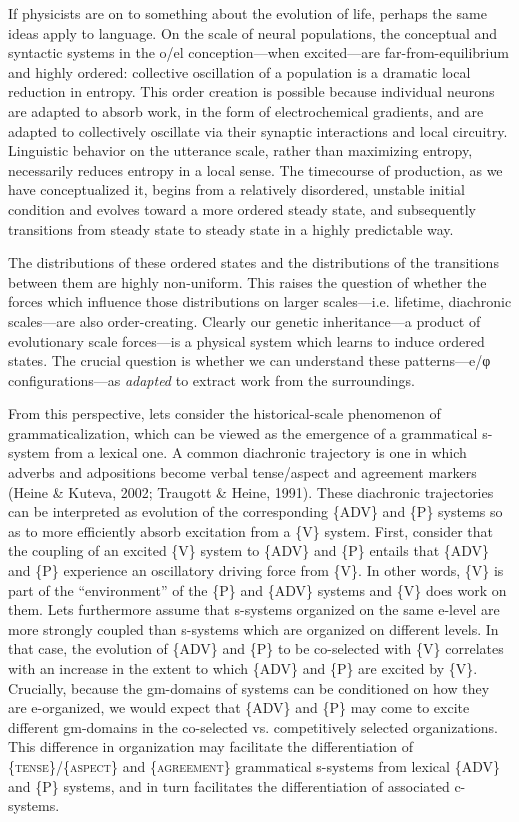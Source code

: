   If physicists are on to something about the evolution of life, perhaps the same ideas apply to language. On the scale of neural populations, the conceptual and syntactic systems in the o/el conception—when excited—are far-from-equilibrium and highly ordered: collective oscillation of a population is a dramatic local reduction in entropy. This order creation is possible because individual neurons are adapted to absorb work, in the form of electrochemical gradients, and are adapted to collectively oscillate via their synaptic interactions and local circuitry. Linguistic behavior on the utterance scale, rather than maximizing entropy, necessarily reduces entropy in a local sense. The timecourse of production, as we have conceptualized it, begins from a relatively disordered, unstable initial condition and evolves toward a more ordered steady state, and subsequently transitions from steady state to steady state in a highly predictable way. 

  The distributions of these ordered states and the distributions of the transitions between them are highly non-uniform. This raises the question of whether the forces which influence those distributions on larger scales—i.e. lifetime, diachronic scales—are also order-creating. Clearly our genetic inheritance—a product of evolutionary scale forces—is a physical system which learns to induce ordered states. The crucial question is whether we can understand these patterns—e/φ configurations—as \textit{adapted} to extract work from the surroundings.

  From this perspective, lets consider the historical-scale phenomenon of grammaticalization, which can be viewed as the emergence of a grammatical s-system from a lexical one. A common diachronic trajectory is one in which adverbs and adpositions become verbal tense/aspect and agreement markers (Heine \& Kuteva, 2002; Traugott \& Heine, 1991). These diachronic trajectories can be interpreted as evolution of the corresponding \{ADV\} and \{P\} systems so as to more efficiently absorb excitation from a \{V\} system. First, consider that the coupling of an excited \{V\} system to \{ADV\} and \{P\} entails that \{ADV\} and \{P\} experience an oscillatory driving force from \{V\}. In other words, \{V\} is part of the “environment” of the \{P\} and \{ADV\} systems and \{V\} does work on them. Lets furthermore assume that s-systems organized on the same e-level are more strongly coupled than s-systems which are organized on different levels. In that case, the evolution of \{ADV\} and \{P\} to be co-selected with \{V\} correlates with an increase in the extent to which \{ADV\} and \{P\} are excited by \{V\}. Crucially, because the gm-domains of systems can be conditioned on how they are e-organized, we would expect that \{ADV\} and \{P\} may come to excite different gm-domains in the co-selected vs. competitively selected organizations. This difference in organization may facilitate the differentiation of \{\textsc{tense}\}/\{\textsc{aspect}\} and \{\textsc{agreement}\} grammatical s-systems from lexical \{ADV\} and \{P\} systems, and in turn facilitates the differentiation of associated c-systems. 

